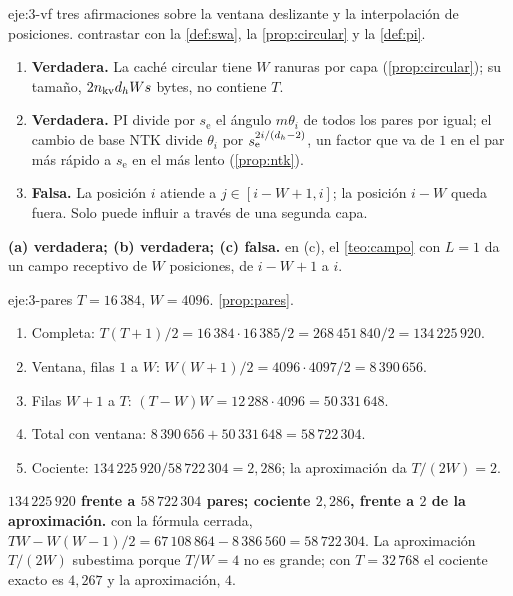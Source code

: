 \begin{solucion}{eje:3-vf}
\datos tres afirmaciones sobre la ventana deslizante y la interpolación de posiciones.
\planteamiento contrastar con la \cref{def:swa}, la \cref{prop:circular} y la \cref{def:pi}.
\pasos
\begin{enumerate}[label=(\alph*)]
  \item \textbf{Verdadera.} La caché circular tiene $W$ ranuras por capa (\cref{prop:circular}); su tamaño, $2n_{\mathrm{kv}}d_{h} Ws$ bytes, no contiene $T$.
  \item \textbf{Verdadera.} PI divide por $s_{\mathrm{e}}$ el ángulo $m\theta_i$ de todos los pares por igual; el cambio de base NTK divide $\theta_i$ por $s_{\mathrm{e}}^{2i/(d_{h}-2)}$, un factor que va de $1$ en el par más rápido a $s_{\mathrm{e}}$ en el más lento (\cref{prop:ntk}).
  \item \textbf{Falsa.} La posición $i$ atiende a $j\in[i-W+1,i]$; la posición $i-W$ queda fuera. Solo puede influir a través de una segunda capa.
\end{enumerate}
\resultado \textbf{(a) verdadera; (b) verdadera; (c) falsa.}
\comprobacion en (c), el \cref{teo:campo} con $L=1$ da un campo receptivo de $W$ posiciones, de $i-W+1$ a $i$.
\end{solucion}

\begin{solucion}{eje:3-pares}
\datos $T=16\,384$, $W=4096$.
\planteamiento \cref{prop:pares}.
\pasos
\begin{enumerate}[label=\arabic*.]
  \item Completa: $T(T+1)/2=16\,384\cdot 16\,385/2=268\,451\,840/2=134\,225\,920$.
  \item Ventana, filas $1$ a $W$: $W(W+1)/2=4096\cdot 4097/2=8\,390\,656$.
  \item Filas $W+1$ a $T$: $(T-W)W=12\,288\cdot 4096=50\,331\,648$.
  \item Total con ventana: $8\,390\,656+50\,331\,648=58\,722\,304$.
  \item Cociente: $134\,225\,920/58\,722\,304=2{,}286$; la aproximación da $T/(2W)=2$.
\end{enumerate}
\resultado \textbf{$134\,225\,920$ frente a $58\,722\,304$ pares; cociente $2{,}286$, frente a $2$ de la aproximación.}
\comprobacion con la fórmula cerrada, $TW-W(W-1)/2=67\,108\,864-8\,386\,560=58\,722\,304$. La aproximación $T/(2W)$ subestima porque $T/W=4$ no es grande; con $T=32\,768$ el cociente exacto es $4{,}267$ y la aproximación, $4$.
\end{solucion}


